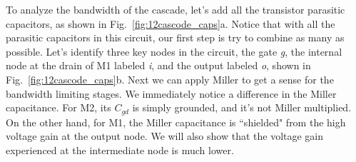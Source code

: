 To analyze the bandwidth of the cascade, let's add all the transistor parasitic capacitors, as shown in Fig.~\ref{fig:12cascode_caps}a.  Notice that with all the parasitic capacitors in this circuit, our first step is try to combine as many as possible.   Let's identify three key nodes in the circuit, the gate \emph{g}, the internal node at the drain of M1 labeled \emph{i}, and the output labeled \emph{o}, shown in Fig.~\ref{fig:12cascode_caps}b.  Next we can apply Miller to get a sense for the bandwidth limiting stages.  We immediately notice a difference in the Miller capacitance.  For M2, its $C_{gd}$ is simply grounded, and it's not Miller multiplied.  On the other hand, for M1, the Miller capacitance is ``shielded" from the high voltage gain at the output node.  We will also show that the voltage gain experienced at the intermediate node is much lower.  
